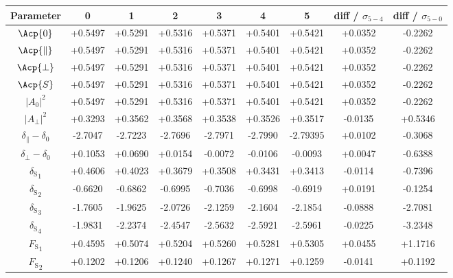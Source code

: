 \begin{table}
\centering
\footnotesize
\begin{tabular}{ c c c c c c c c c }
    Parameter  & 0          & 1          & 2          & 3          & 4          & 5           &  diff / $\sigma_{5-4}$  & diff / $\sigma_{5-0}$ \\
    \hline
    $\Acp{0}$                          & +0.5497  & +0.5291  & +0.5316  & +0.5371  & +0.5401  & +0.5421  & +0.0352 & -0.2262 \\
    $\Acp{\parallel}$                          & +0.5497  & +0.5291  & +0.5316  & +0.5371  & +0.5401  & +0.5421  & +0.0352 & -0.2262 \\
    $\Acp{\perp}$                          & +0.5497  & +0.5291  & +0.5316  & +0.5371  & +0.5401  & +0.5421  & +0.0352 & -0.2262 \\
    $\Acp{S}$                          & +0.5497  & +0.5291  & +0.5316  & +0.5371  & +0.5401  & +0.5421  & +0.0352 & -0.2262 \\
    $|A_0|^2$                          & +0.5497  & +0.5291  & +0.5316  & +0.5371  & +0.5401  & +0.5421  & +0.0352 & -0.2262 \\
    $|A_\perp|^2$                       & +0.3293  & +0.3562  & +0.3568  & +0.3538  & +0.3526  & +0.3517  & -0.0135 & +0.5346 \\
    $\delta_\parallel-\delta_0$          & -2.7047  & -2.7223  & -2.7696  & -2.7971  & -2.7990  & -2.79395 & +0.0102 & -0.3068 \\
    $\delta_\perp-\delta_0$             & +0.1053  & +0.0690  & +0.0154  & -0.0072  & -0.0106  & -0.0093  & +0.0047 & -0.6388 \\
    ${\delta_\text{S}}_1$               & +0.4606  & +0.4023  & +0.3679  & +0.3508  & +0.3431  & +0.3413  & -0.0114 & -0.7396 \\
    ${\delta_\text{S}}_2$               & -0.6620  & -0.6862  & -0.6995  & -0.7036  & -0.6998  & -0.6919  & +0.0191 & -0.1254 \\
    ${\delta_\text{S}}_3$               & -1.7605  & -1.9625  & -2.0726  & -2.1259  & -2.1604  & -2.1854  & -0.0888 & -2.7081 \\
    ${\delta_\text{S}}_4$               & -1.9831  & -2.2374  & -2.4547  & -2.5632  & -2.5921  & -2.5961  & -0.0225 & -3.2348 \\
    ${F_\text{S}}_1$                    & +0.4595  & +0.5074  & +0.5204  & +0.5260  & +0.5281  & +0.5305  & +0.0455 & +1.1716 \\
    ${F_\text{S}}_2$                    & +0.1202  & +0.1206  & +0.1240  & +0.1267  & +0.1271  & +0.1259  & -0.0141 & +0.1192 \\

\end{tabular}
\end{table}
